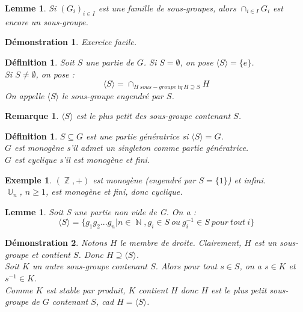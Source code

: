\documentclass[a4paper, oneside]{report}
\theoremstyle{break}
\newtheorem{defi}[thm]{Définition}
\newtheorem{lemme}[thm]{Lemme}
\newtheorem{exem}[thm]{Exemple}
\newtheorem{remar}[thm]{Remarque}
\newtheorem*{demo}{Démonstration}
\DeclareMathOperator{\N}{\mathbb{N}}
\DeclareMathOperator{\Z}{\mathbb{Z}}
\DeclareMathOperator{\U}{\mathbb{U}}
\begin{document}
\begin{lemme}
	Si $(G_i)_{i\in I}$ est une famille de sous-groupes, alors $\cap_{i\in I}G_i$ est encore un sous-groupe.
\end{lemme}

\begin{demo}
	Exercice facile.
\end{demo}

\begin{defi}
	Soit $S$ une partie de $G$. Si $S=\emptyset$, on pose $\langle S\rangle=\{e\}$.\\
	Si $S\neq \emptyset$, on pose :
	$$\langle S\rangle = \cap_{H~sous-groupe~tq~H\supseteq S}H$$
	On appelle $\langle S\rangle$ le sous-groupe engendré par $S$.
\end{defi}

\begin{remar}
	$\langle S\rangle$ est le plus petit des sous-groupe contenant $S$.
\end{remar}

\begin{defi}
	$S\subseteq G$ est une partie génératrice si $\langle S\rangle=G$.\\
	$G$ est monogène s'il admet un singleton comme partie génératrice.\\
	$G$ est cyclique s'il est monogène et fini.
\end{defi}

\begin{exem}
	$(\Z,+)$ est monogène (engendré par $S=\{1\}$) et infini.\\
	$\U_n$, $n\geq 1$, est monogène et fini, donc cyclique.
\end{exem}

\begin{lemme}
	Soit S une partie non vide de G. On a :
	$$\langle S\rangle = \{g_1g_2...g_n | n\in \N, g_i\in S~ou~g_i^{-1}\in S~pour~tout~i  \}$$
	
\end{lemme}

\begin{demo}
	Notons $H$ le membre de droite. Clairement, $H$ est un sous-groupe et contient $S$. Donc $H \supseteq \langle S\rangle$.\\
	Soit $K$ un autre sous-groupe contenant $S$. Alors pour tout $s\in S$, on a $s\in K$ et $s^{-1}\in K$.\\
	Comme $K$ est stable par produit, $K$ contient $H$ donc $H$ est le plus petit sous-groupe de $G$ contenant $S$, cad $H=\langle S\rangle$.
\end{demo}
\end{document}
